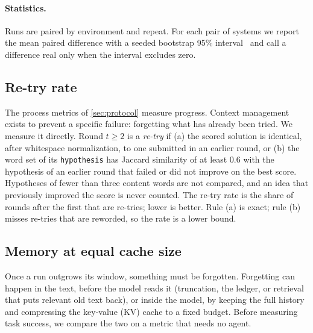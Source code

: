 \documentclass[11pt]{article}
\newcommand{\code}[1]{\texttt{#1}}
\begin{document}
\paragraph{Statistics.}
Runs are paired by environment and repeat. For each pair of systems we report the mean paired difference with a seeded bootstrap 95\% interval~\citep{efron1979bootstrap} and call a difference real only when the interval excludes zero.

\subsection{Re-try rate}
\label{sec:retry}
The process metrics of \cref{sec:protocol} measure progress. Context management exists to prevent a specific failure: forgetting what has already been tried. We measure it directly. Round $t \ge 2$ is a \emph{re-try} if (a) the scored solution is identical, after whitespace normalization, to one submitted in an earlier round, or (b) the word set of its \code{hypothesis} has Jaccard similarity of at least 0.6 with the hypothesis of an earlier round that failed or did not improve on the best score. Hypotheses of fewer than three content words are not compared, and an idea that previously improved the score is never counted. The re-try rate is the share of rounds after the first that are re-tries; lower is better. Rule (a) is exact; rule (b) misses re-tries that are reworded, so the rate is a lower bound.

\subsection{Memory at equal cache size}
\label{sec:memory}
Once a run outgrows its window, something must be forgotten. Forgetting can happen in the text, before the model reads it (truncation, the ledger, or retrieval that puts relevant old text back), or inside the model, by keeping the full history and compressing the key-value (KV) cache to a fixed budget. Before measuring task success, we compare the two on a metric that needs no agent.
\end{document}
